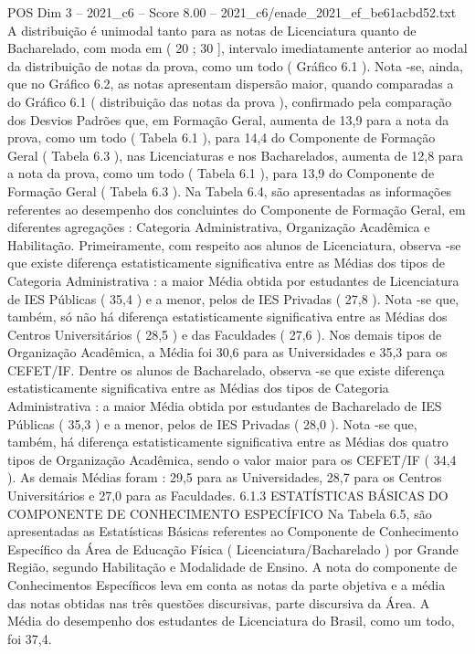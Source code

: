 \begin{textsample}{POS Dim 3 – 2021\_c6 – Score 8.00 – 2021\_c6/enade\_2021\_ef\_be61acbd52.txt}
A distribuição é unimodal tanto para as notas de Licenciatura quanto de Bacharelado, com moda em ( 20 ; 30 ], intervalo imediatamente anterior ao modal da distribuição de notas da prova, como um todo ( Gráfico 6.1 ).
Nota -se, ainda, que no Gráfico 6.2, as notas apresentam dispersão maior, quando comparadas a do Gráfico 6.1 ( distribuição das notas da prova ), confirmado pela comparação dos Desvios Padrões que, em Formação Geral, aumenta de 13,9 para a nota da prova, como um todo ( Tabela 6.1 ), para 14,4 do Componente de Formação Geral ( Tabela 6.3 ), nas Licenciaturas e nos Bacharelados, aumenta de 12,8 para a nota da prova, como um todo ( Tabela 6.1 ), para 13,9 do Componente de Formação Geral ( Tabela 6.3 ).
Na Tabela 6.4, são apresentadas as informações referentes ao desempenho dos concluintes do Componente de Formação Geral, em diferentes agregações : Categoria Administrativa, Organização Acadêmica e Habilitação.
Primeiramente, com respeito aos alunos de Licenciatura, observa -se que existe diferença estatisticamente significativa entre as Médias dos tipos de Categoria Administrativa : a maior Média obtida por estudantes de Licenciatura de IES Públicas ( 35,4 ) e a menor, pelos de IES Privadas ( 27,8 ).
Nota -se que, também, só não há diferença estatisticamente significativa entre as Médias dos Centros Universitários ( 28,5 ) e das Faculdades ( 27,6 ).
Nos demais tipos de Organização Acadêmica, a Média foi 30,6 para as Universidades e 35,3 para os CEFET/IF.
Dentre os alunos de Bacharelado, observa -se que existe diferença estatisticamente significativa entre as Médias dos tipos de Categoria Administrativa : a maior Média obtida por estudantes de Bacharelado de IES Públicas ( 35,3 ) e a menor, pelos de IES Privadas ( 28,0 ).
Nota -se que, também, há diferença estatisticamente significativa entre as Médias dos quatro tipos de Organização Acadêmica, sendo o valor maior para os CEFET/IF ( 34,4 ).
As demais Médias foram : 29,5 para as Universidades, 28,7 para os Centros Universitários e 27,0 para as Faculdades. 6.1.3 ESTATÍSTICAS BÁSICAS DO COMPONENTE DE CONHECIMENTO ESPECÍFICO Na Tabela 6.5, são apresentadas as Estatísticas Básicas referentes ao Componente de Conhecimento Específico da Área de Educação Física ( Licenciatura/Bacharelado ) por Grande Região, segundo Habilitação e Modalidade de Ensino.
A nota do componente de Conhecimentos Específicos leva em conta as notas da parte objetiva e a média das notas obtidas nas três questões discursivas, parte discursiva da Área.
A Média do desempenho dos estudantes de Licenciatura do Brasil, como um todo, foi 37,4.

\end{textsample}
